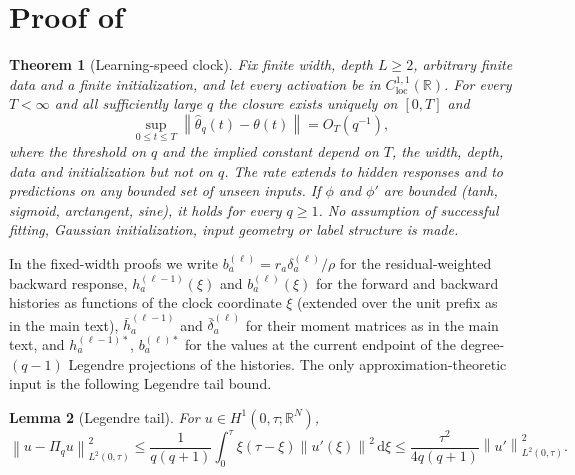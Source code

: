 \documentclass[11pt]{article}
\newtheorem{theorem}{Theorem}[section]
\newtheorem{lemma}[theorem]{Lemma}
\theoremstyle{definition}
\theoremstyle{remark}
\newcommand{\R}{\mathbb{R}}
\newcommand{\norm}[1]{\left\lVert #1\right\rVert}
\newcommand{\dd}{\,\mathrm{d}}
\begin{document}
\appendix






\section{\texorpdfstring{Proof of }{Proof of the learning-speed clock theorem}}
\label{app:proof-old}

\begin{theorem}[Learning-speed clock]
\label{thm:old}
Fix finite width, depth $L\ge2$, arbitrary finite data and a finite
initialization, and let every activation be in $C^{1,1}_{\mathrm{loc}}(\R)$.  For
every $T<\infty$ and all sufficiently large $q$ the closure exists uniquely on
$[0,T]$ and
\[
 \sup_{0\le t\le T}\norm{\widehat\theta_q(t)-\theta(t)}=O_T(q^{-1}),
\]
where the threshold on $q$ and the implied constant depend on $T$, the width,
depth, data and initialization but not on $q$.
The rate extends to hidden responses and to predictions on any bounded set of
unseen inputs.  If $\phi$ and $\phi'$ are bounded (tanh, sigmoid, arctangent,
sine), it holds for every $q\ge1$.  No assumption of successful fitting, Gaussian
initialization, input geometry or label structure is made.
\end{theorem}



In the fixed-width proofs we write $b^{(\ell)}_a=r_a\delta^{(\ell)}_a/\rho$ for the
residual-weighted backward response, $h^{(\ell-1)}_a(\xi)$ and $b^{(\ell)}_a(\xi)$
for the forward and backward histories as functions of the clock coordinate
$\xi$ (extended over the unit prefix as in the main text), $\bar h^{(\ell-1)}_a$
and $\bar\delta^{(\ell)}_a$ for their moment matrices as in the main text, and
$h^{(\ell-1)*}_a$, $b^{(\ell)*}_a$ for the values at the current endpoint of the
degree-$(q-1)$ Legendre projections of the histories.  The only approximation-theoretic input is the following
Legendre tail bound.

\begin{lemma}[Legendre tail]
\label{lem:legendre}
For $u\in H^1(0,\tau;\R^N)$,
\begin{equation}
 \norm{u-\Pi_q u}_{L^2(0,\tau)}^2
 \le\frac{1}{q(q+1)}\int_0^\tau \xi(\tau-\xi)
 \norm{u'(\xi)}^2\dd\xi
 \le\frac{\tau^2}{4q(q+1)}\norm{u'}_{L^2(0,\tau)}^2. \label{eq:leg-tail}
\end{equation}
\end{lemma}
\end{document}
